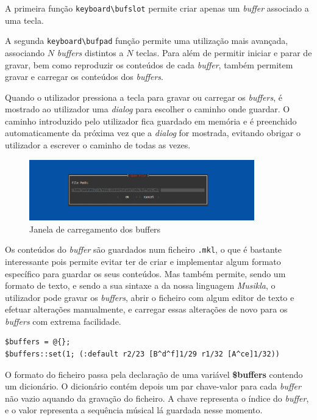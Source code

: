 A primeira função \texttt{keyboard\textbackslash{}bufslot} permite criar apenas um \textit{buffer} associado a uma tecla.

A segunda \texttt{keyboard\textbackslash{}bufpad} função permite uma utilização mais avançada, associando $N$ \textit{buffers} distintos a $N$ teclas. Para além de permitir iniciar e parar de gravar, bem como reproduzir os conteúdos de cada \textit{buffer}, também permitem gravar e carregar os conteúdos dos \textit{buffers}.

Quando o utilizador pressiona a tecla para gravar ou carregar os \textit{buffers}, é mostrado ao utilizador uma \textit{dialog} para escolher o caminho onde guardar. O caminho introduzido pelo utilizador fica guardado em memória e é preenchido automaticamente da próxima vez que a \textit{dialog} for mostrada, evitando obrigar o utilizador a escrever o caminho de todas as vezes.

\begin{figure}[h]
\begin{center}
    \includegraphics[width=0.87\textwidth]{img/open_buffers_dialog.png}
\end{center}
\caption{Janela de carregamento dos buffers}
\end{figure}

Os conteúdos do \textit{buffer} são guardados num ficheiro \texttt{.mkl}, o que é bastante interessante pois permite evitar ter de criar e implementar algum formato específico para guardar os seus conteúdos. Mas também permite, sendo um formato de texto, e sendo a sua sintaxe a da nossa linguagem \textit{Musikla}, o utilizador pode gravar os \textit{buffers}, abrir o ficheiro com algum editor de texto e efetuar alterações manualmente, e carregar essas alterações de novo para os \textit{buffers} com extrema facilidade.

\begin{lstlisting}[caption={Formato do ficheiro de gravação dos \textit{buffers}.}]
$buffers = @{};
$buffers::set(1; (:default r2/23 [B^d^f]1/29 r1/32 [A^ce]1/32))
\end{lstlisting}

O formato do ficheiro passa pela declaração de uma variável \textbf{\$buffers} contendo um dicionário. O dicionário contém depois um par chave-valor para cada \textit{buffer} não vazio aquando da gravação do ficheiro. A chave representa o índice do \textit{buffer}, e o valor representa a sequência músical lá guardada nesse momento.

